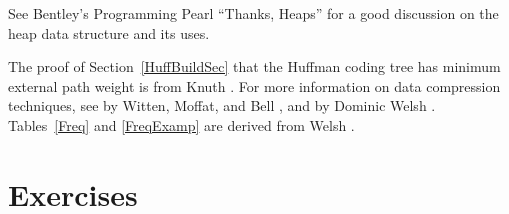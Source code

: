 See Bentley's Programming Pearl ``Thanks, Heaps''
\cite{Heaps,BentleyMore} for a good discussion on the heap data
structure and its uses.

The proof of Section~\ref{HuffBuildSec} that the Huffman coding
tree
has minimum external path weight is from Knuth \cite{KnuthV1}.
For more information on data compression techniques, see
 by Witten, Moffat, and Bell \cite{WMB99}, and
 by Dominic Welsh \cite{Welsh}.
Tables~\ref{Freq} and \ref{FreqExamp} are derived from
Welsh \cite{Welsh}.

\section{Exercises}

